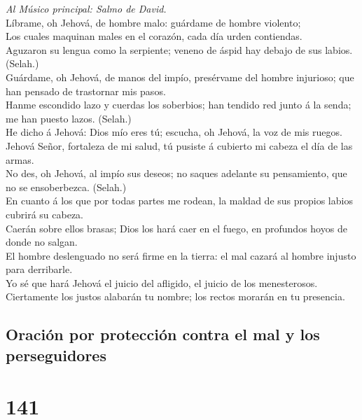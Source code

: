  \emph{Al Músico principal: Salmo de David.}\\
Líbrame, oh Jehová, de hombre malo: guárdame de hombre violento;\\
 Los cuales maquinan males en el corazón, cada día urden
contiendas.\\
 Aguzaron su lengua como la serpiente; veneno de áspid hay
debajo de sus labios. (Selah.)\\
 Guárdame, oh Jehová, de manos del impío, presérvame del
hombre injurioso; que han pensado de trastornar mis pasos.\\
 Hanme escondido lazo y cuerdas los soberbios; han tendido
red junto á la senda; me han puesto lazos. (Selah.)\\
 He dicho á Jehová: Dios mío eres tú; escucha, oh Jehová, la
voz de mis ruegos.\\
 Jehová Señor, fortaleza de mi salud, tú pusiste á cubierto
mi cabeza el día de las armas.\\
 No des, oh Jehová, al impío sus deseos; no saques adelante
su pensamiento, que no se ensoberbezca. (Selah.)\\
 En cuanto á los que por todas partes me rodean, la maldad
de sus propios labios cubrirá su cabeza.\\
 Caerán sobre ellos brasas; Dios los hará caer en el fuego,
en profundos hoyos de donde no salgan.\\
 El hombre deslenguado no será firme en la tierra: el mal
cazará al hombre injusto para derribarle.\\
 Yo sé que hará Jehová el juicio del afligido, el juicio de
los menesterosos.\\
 Ciertamente los justos alabarán tu nombre; los rectos
morarán en tu presencia.

\hypertarget{oraciuxf3n-por-protecciuxf3n-contra-el-mal-y-los-perseguidores}{%
\subsection{Oración por protección contra el mal y los
perseguidores}\label{oraciuxf3n-por-protecciuxf3n-contra-el-mal-y-los-perseguidores}}

\hypertarget{section-140}{%
\section{141}\label{section-140}}

